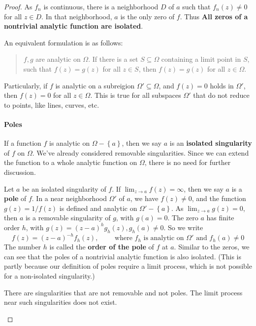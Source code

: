 \documentclass[../main.tex]{subfiles}
\begin{document}
\begin{proof}
As $f_n$ is continuous, there is a neighborhood $D$ of $a$ such that $f_n(z) \neq 0$ for all $z\in D$. In that neighborhood, $a$ is the only zero of $f$. Thus \textbf{All zeros of a nontrivial analytic function are isolated}.

An equivalent formulation is as follows:
\begin{quote}
	$f,g$ are analytic on $\Omega$. If there is a set $S \subseteq \Omega$ containing a limit point in $S$, such that $f(z) = g(z)$ for all $z\in S$, then $f(z) = g(z)$ for all $z\in \Omega$.
\end{quote}
Particularly, if $f$ is analytic on a subreigion $\Omega' \subseteq \Omega$, and $f(z) = 0$ holds in $\Omega'$, then $f(z) = 0$ for all $z\in \Omega$. This is true for all subspaces $\Omega'$ that do not reduce to points, like lines, curves, etc.

\paragraph{Poles}

If a function $f$ is analytic on $\Omega-\left\{ a \right\}$, then we say $a$ is an \textbf{isolated singularity} of $f$ on $\Omega$. We've already considered removable singularities. Since we can extend the function to a whole analytic function on $\Omega$, there is no need for further discussion.

Let $a$ be an isolated singularity of $f$. If $\displaystyle \lim_{z \to a} f(z) = \infty $, then we say $a$ is a \textbf{pole} of $f$. In a near neighborhood $\Omega'$ of $a$, we have $f(z)\neq 0$, and the function $g(z) = 1 / f(z)$ is defined and analytic on $\Omega'-\left\{ a \right\}$. As $\lim_{z \to a} g(z) = 0$, then $a$ is a removable singularity of $g$, with $g(a) = 0$. The zero $a$ has finite order $h$, with $g(z) = (z-a)^hg_h(z),g_h(a)\neq 0$. So we write
\begin{equation}
	f(z) = (z-a)^{-h} f_h(z), \qquad \text{ where } f_h \text{ is analytic on } \Omega' \text{ and } f_h(a) \neq 0
\end{equation}
The number $h$ is called the \textbf{order of the pole} of $f$ at $a$. Similar to the zeros, we can see that the poles of a nontrivial analytic function is also isolated. (This is partly because our definition of poles require a limit process, which is not possible for a non-isolated singularity.)

\begin{remark}
	There are singularities that are not removable and not poles. The limit process near such singularities does not exist.
\end{remark}


\end{proof}
\end{document}
